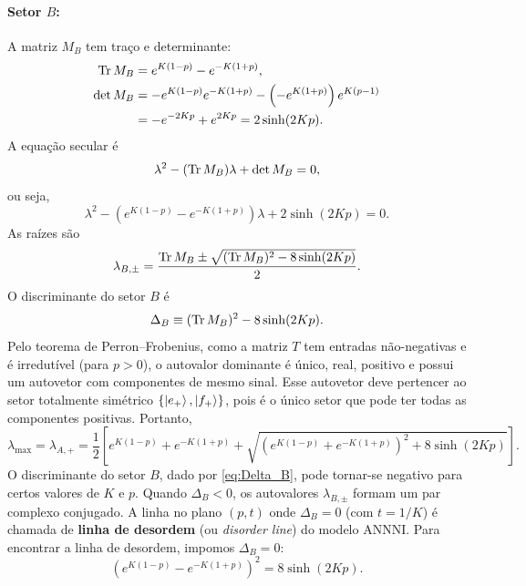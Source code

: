 \documentclass[11pt,a4paper]{article}
\begin{document}
\paragraph{Setor \(B\):} A matriz \(M_B\) tem traço e determinante:
%
\begin{align}
    \Tr M_B &= e^{K(1-p)} - e^{-K(1+p)}, \\
    \det M_B &= -e^{K(1-p)} e^{-K(1+p)} - \left( -e^{K(1+p)} \right) e^{K(p-1)} \\
    &= -e^{-2Kp} + e^{2Kp} = 2\sinh(2Kp).
\end{align}
%
A equação secular é
%
\begin{equation}
    \lambda^2 - (\Tr M_B) \lambda + \det M_B = 0,
\end{equation}
ou seja,
%
\begin{equation}
    \lambda^2 - \left( e^{K(1-p)} - e^{-K(1+p)} \right) \lambda + 2\sinh(2Kp) = 0.
\end{equation}
%
As raízes são
%
\begin{equation}
    \lambda_{B,\pm} = \frac{\Tr M_B \pm \sqrt{(\Tr M_B)^2 - 8\sinh(2Kp)}}{2}.
    \label{eq:lambdas_B}
\end{equation}
%
O discriminante do setor \(B\) é
%
\begin{equation}
    \Delta_B \equiv (\Tr M_B)^2 - 8\sinh(2Kp).
    \label{eq:Delta_B}
\end{equation}
%
Pelo teorema de Perron–Frobenius, como a matriz \(T\) tem entradas não-negativas e é irredutível (para \(p>0\)), o autovalor dominante é único, real, positivo e possui um autovetor com componentes de mesmo sinal. Esse autovetor deve pertencer ao setor totalmente simétrico \(\{ \ket{e_+}, \ket{f_+} \}\), pois é o único setor que pode ter todas as componentes positivas. Portanto,
%
\begin{equation}
    \boxed{
    \lambda_{\max} = \lambda_{A,+}
    = \frac{1}{2} \left[
        e^{K(1-p)} + e^{-K(1+p)}
        + \sqrt{ \left( e^{K(1-p)} + e^{-K(1+p)} \right)^2 + 8\sinh(2Kp) }
    \right].
    }
    \label{eq:lambda_max_annni}
\end{equation}
%
O discriminante do setor \(B\), dado por \eqref{eq:Delta_B}, pode tornar-se negativo para certos valores de \(K\) e \(p\). Quando \(\Delta_B < 0\), os autovalores \(\lambda_{B,\pm}\) formam um par complexo conjugado. A linha no plano \((p, t)\) onde \(\Delta_B = 0\) (com \(t = 1/K\)) é chamada de \textbf{linha de desordem} (ou \textit{disorder line}) do modelo ANNNI.
%
Para encontrar a linha de desordem, impomos \(\Delta_B = 0\):
%
\begin{equation}
    \left( e^{K(1-p)} - e^{-K(1+p)} \right)^2 = 8\sinh(2Kp).
\end{equation}
\end{document}
